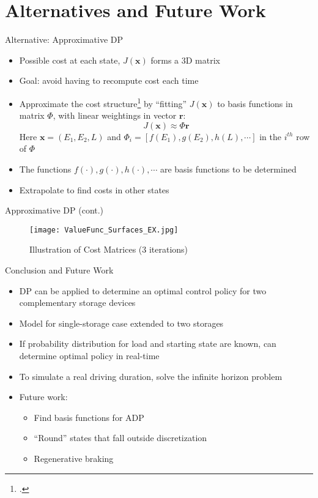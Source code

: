 \documentclass{beamer}
\begin{document}
\section{Alternatives and Future Work}
\begin{frame}{Alternative: Approximative DP}
\begin{itemize}
	\item Possible cost at each state, $J(\textbf{x})$ forms a 3D matrix
	\item Goal: avoid having to recompute cost each time
	\item Approximate the cost structure\footcite{bertsekas1995dynamic} by “fitting” $J(\textbf{x})$ to basis functions in matrix $\Phi$,  with linear weightings in vector $\textbf{r}$:
	\begin{equation}
		J(\textbf{x})\approx\Phi\textbf{r}
	\end{equation}
	Here $\textbf{x}=(E_{1},E_{2},L)$ and
	\begin{math}
		\Phi_{i}=[f(E_{1}),g(E_{2}),h(L),\cdots]
	\end{math}
	in the $i^{th}$ row of $\Phi$
	\item The functions $f(\cdot), g(\cdot), h(\cdot), \cdots$ are basis functions to be determined
	\item Extrapolate to find costs in other states

\end{itemize}
\end{frame}

\begin{frame}{Approximative DP (cont.)}
	\begin{figure}
		\texttt{[image: ValueFunc\_Surfaces\_EX.jpg]}
		\caption{Illustration of Cost Matrices (3 iterations)}
	\end{figure}
\end{frame}


\begin{frame}{Conclusion and Future Work}
	\begin{itemize}
		\item DP can be applied to determine an optimal control policy for two complementary storage devices
		\item Model for single-storage case extended to two storages
		\item If probability distribution for load and starting state are known, can determine optimal policy in real-time
		\item To simulate a real driving duration, solve the infinite horizon problem
		\item Future work:
		\begin{itemize}
			\item Find basis functions for ADP
			\item “Round” states that fall outside discretization
			\item Regenerative braking
		\end{itemize}
		
	\end{itemize}
\end{frame}
\end{document}
